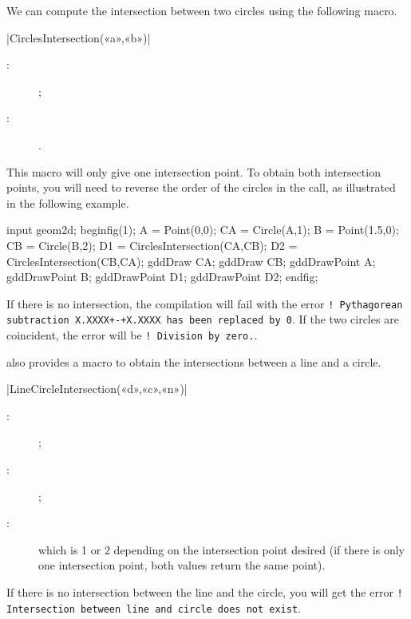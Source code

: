 \documentclass[a4paper,english]{article}
\begin{document}
We can compute the intersection between two circles using the following macro.

\begin{colourband}
\macro|CirclesIntersection(«a»,«b»)|
\begin{description}
  \item[:]   ;
  \item[:]  .
\end{description}
\end{colourband}
\bigskip

This macro will only give one intersection point. To obtain both intersection points, you will need to reverse the order of the circles in the call, as illustrated in the following example.

\begin{ExempleMP}
input geom2d;
beginfig(1);
A = Point(0,0);
CA = Circle(A,1);
B = Point(1.5,0);
CB = Circle(B,2);
D1 = CirclesIntersection(CA,CB);
D2 = CirclesIntersection(CB,CA);
gddDraw CA; gddDraw CB;
gddDrawPoint A; gddDrawPoint B; gddDrawPoint D1; gddDrawPoint D2;
endfig;
\end{ExempleMP}

If there is no intersection, the compilation will fail with the error
\texttt{! Pythagorean subtraction X.XXXX+-+X.XXXX has been replaced by 0}. If
the two circles are coincident, the error will be \texttt{! Division by zero.}.

\mpgeomdd also provides a macro to obtain the intersections between a
line and a circle.

\begin{colourband}
\macro|LineCircleIntersection(«d»,«c»,«n»)|
\begin{description}
  \item[:]   ;
  \item[:]   ;
  \item[:]  which is 1 or 2 depending on the intersection
  point desired (if there is only one intersection point, both values return the same point).
\end{description}
\end{colourband}
\bigskip

If there is no intersection between the line and the circle, you will get
the error \texttt{! Intersection between line and circle does not exist}.
\end{document}
